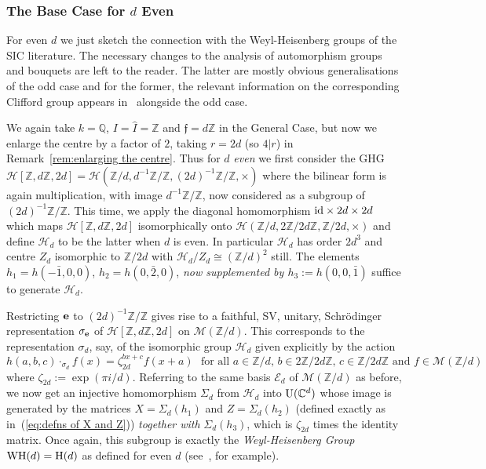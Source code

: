 \documentclass[12pt]{article}
\newcounter{example}[section]
\newcommand{\addwords}[1]{\ \ \ \mbox{#1}}
\newcommand{\bbC}{\ensuremath{\mathbb{C}}}\newcommand{\bbCp}{\ensuremath{\mathbb{C}_p}}
\newcommand{\bbQ}{\ensuremath{\mathbb{Q}}}
\newcommand{\bbZ}{\ensuremath{\mathbb{Z}}}
\newcommand{\be}{\ensuremath{{\bf e}}}
\newcommand{\cE}{\ensuremath{\mathcal{E}}}
\newcommand{\cH}{\ensuremath{\mathcal{H}}}
\newcommand{\cM}{\mathcal{M}}
\newcommand{\ff}{\ensuremath{\mathfrak{f}}}
\newcommand{\id}{{\rm id}}
\newcommand{\inv}{^{-1}}%
\newcommand{\U}{{\rm U}}
\newcommand{\Zover}[1]{\ensuremath{\bbZ/#1}}
\newcommand{\Zunder}[1]{#1 \inv\bbZ/\bbZ}
\newcommand{\Hei}[4]{\cH({#1},{#2},{#3},{#4})}
\begin{document}
\subsubsection{The Base Case for $d$ Even}
For even $d$ we just sketch the connection with 
the Weyl-Heisenberg groups of the SIC literature. 
The necessary changes to the analysis of automorphism groups and bouquets are left to the reader. The latter are mostly obvious generalisations  of the odd case and for the former, the relevant information on the corresponding Clifford group appears in~\cite{DMA: SICPOVMs and the ECG} alongside the odd case.

We again take $k=\bbQ$, $I=\hat I=\bbZ$ and $\ff=d\bbZ$ in the General Case, but now we enlarge the centre by a factor of $2$, taking $r=2d$ (so $4|r$) in 
Remark~\ref{rem:enlarging the centre}. Thus for $d$ \textit{even} we first consider the GHG
$
\cH[\bbZ,d\bbZ,2d]=\Hei{\Zover{d}}{\Zunder{d}}{\Zunder{(2d)}}{\times}
$
where the bilinear form is again multiplication, with image $\Zunder{d}$, now  considered as a subgroup of $\Zunder{(2d)}$. This time, we apply the diagonal homomorphism $\id\times 2d\times 2d$ which maps $\cH[\bbZ,d\bbZ, 2d]$ isomorphically onto 
$\cH(\Zover{d},2\bbZ/2d\bbZ,\Zover{2d},\times)$ and define $\cH_d$ to be the latter when $d$ is even. In particular $\cH_d$ has order $2d^3$ and centre $Z_d$ isomorphic to $\Zover{2d}$ with $\cH_d/Z_d\cong(\Zover{d})^2$ still. The elements $h_1=h(-\bar 1, 0,0)$, 
$h_2=h(0,\bar 2, 0)$, \textit{now supplemented by $h_3:=h(0,0,\bar 1)$} suffice to  generate $\cH_d$. 

Restricting $\be$ to $\Zunder{(2d)}$ gives rise to a faithful, SV, unitary,  Schr\"odinger representation $\sigma_\be$ of $\cH[\bbZ,d\bbZ,2d]$ on $\cM(\Zover{d})$. This corresponds to the representation
$\sigma_d $, say, of 
the isomorphic group $\cH_d$
given explicitly by the action 
\begin{equation}\label{eq:Schrod rep in Base Case2}
	h(a,b,c)\cdot_{\sigma_d} f(x)=\zeta_{2d}^{bx+c}f(x+a)
	\addwords{for all $a\in \Zover{d}$, $b\in 2\bbZ/2d\bbZ$, $c\in\bbZ/2d\bbZ$ and $f\in\cM(\Zover{d})$}
\end{equation}
where $\zeta_{2d}:=\exp(\pi i/d)$. Referring to the same basis $\cE_d$ of $\cM(\Zover{d})$ as before, we now get an injective homomorphism $\Sigma_d$ from  $\cH_d$ into $\U(\bbC^d)$ whose image is  
generated by the matrices $X=\Sigma_d(h_1)$ and 
$Z=\Sigma_d(h_2)$ (defined exactly as in~(\ref{eq:defns of X and Z})) \textit{together with} $\Sigma_d(h_3)$, which is $\zeta_{2d}$ times the identity matrix. Once again, this subgroup is exactly 
the \textit{Weyl-Heisenberg Group} ${\rm WH}(d)={\rm H}(d)$ as defined for even $d$ (see~\cite{Kopp IMRN}, for example).
\end{document}
